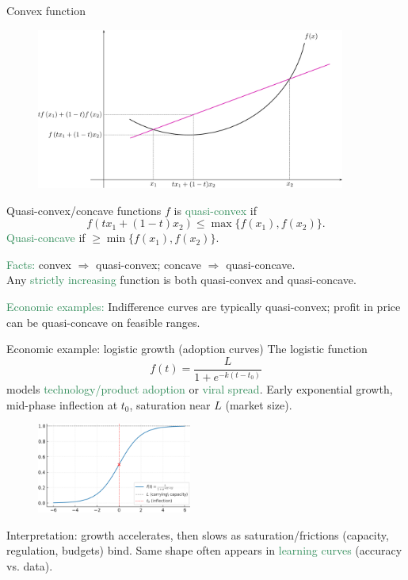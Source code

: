 \documentclass[11pt,aspectratio=169]{beamer}
\begin{document}
\begin{frame}{Convex function}
\begin{figure}
\includegraphics[width=4in]{img/convex} 
\end{figure}
\end{frame}



\begin{frame}{Quasi-convex/concave functions}
$f$ is \textcolor{SeaGreen}{quasi-convex} if
\[
f(tx_1+(1-t)x_2)\le \max\{f(x_1),f(x_2)\}.
\]
\textcolor{SeaGreen}{Quasi-concave} if $\ge \min\{f(x_1),f(x_2)\}$.
\bigskip

\textcolor{SeaGreen}{Facts:} convex $\Rightarrow$ quasi-convex; concave $\Rightarrow$ quasi-concave.\\[4mm]
Any \textcolor{SeaGreen}{strictly increasing} function is both quasi-convex and quasi-concave.\\[4mm]
\smallskip

\textcolor{SeaGreen}{Economic examples:} Indifference curves are typically quasi-convex; profit in price can be quasi-concave on feasible ranges.
\end{frame}

\begin{frame}{Economic example: logistic growth (adoption curves)}
The logistic function 
\[
f(t) = \frac{L}{1 + e^{-k(t - t_0)}}
\]
models \textcolor{SeaGreen}{technology/product adoption} or \textcolor{SeaGreen}{viral spread}. Early exponential growth, mid-phase inflection at $t_0$, saturation near $L$ (market size).
\begin{minipage}{6cm}{}
	\begin{figure}
\includegraphics[width=2in]{img/returns1.png} 
\end{figure}
\end{minipage}\begin{minipage}{9cm}{}
\small
Interpretation: growth accelerates, then slows as saturation/frictions (capacity, regulation, budgets) bind. Same shape often appears in \textcolor{SeaGreen}{learning curves} (accuracy vs. data).
\end{minipage}
\end{frame}
\end{document}
